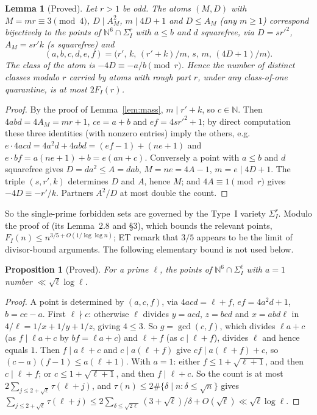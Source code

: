 \documentclass[11pt,reqno]{amsart}
\newtheorem{lemma}[theorem]{Lemma}
\newtheorem{proposition}[theorem]{Proposition}
\theoremstyle{definition}
\begin{document}
\begin{lemma}[Proved]\label{lem:dict}
Let $r>1$ be odd.  The atoms $(M,D)$ with $M=mr\equiv3\pmod4$, $D\mid A_M^2$,
$m\mid4D+1$ and $D\le A_M$ \textup{(}any $m\ge1$\textup{)} correspond
bijectively to the points of $\mathbb N^6\cap\Sigma_I^r$ with $a\le b$ and $d$
squarefree, via $D=sr'^2$, $A_M=sr'k$ \textup{(}$s$ squarefree\textup{)} and
\[
 (a,b,c,d,e,f)=\big(r',\,k,\,(r'+k)/m,\,s,\,m,\,(4D+1)/m\big).
\]
The class of the atom is $-4D\equiv-a/b\pmod r$.  Hence the number of distinct
classes modulo $r$ carried by atoms with rough part $r$, under any class-of-one
quarantine, is at most $2F_I(r)$.
\end{lemma}

\begin{proof}
By the proof of Lemma~\ref{lem:mass}, $m\mid r'+k$, so $c\in\mathbb N$.  Then
$4abd=4A_M=mr+1$, $ce=a+b$ and $ef=4sr'^2+1$; by direct computation these three
identities (with nonzero entries) imply the others, e.g.\
$e\cdot4acd=4a^2d+4abd=(ef-1)+(ne+1)$ and $e\cdot bf=a(ne+1)+b=e(an+c)$.
Conversely a point with $a\le b$ and $d$ squarefree gives $D=da^2\le A=dab$,
$M=ne=4A-1$, $m=e\mid4D+1$.  The triple $(s,r',k)$ determines $D$ and $A$,
hence $M$; and $4A\equiv1\pmod r$ gives $-4D\equiv-r'/k$.  Partners $A^2/D$ at
most double the count.
\end{proof}

So the single-prime forbidden sets are governed by the Type~I variety
$\Sigma_I^r$.  Modulo the proof of \cite[Prop.~1.7]{ET} (its Lemma~2.8 and \S3),
which bounds the relevant points, $F_I(n)\le n^{3/5+O(1/\log\log n)}$; ET remark
that $3/5$ appears to be the limit of divisor-bound arguments.  The following
elementary bound is not used below.

\begin{proposition}[Proved]\label{prop:a1}
For a prime $\ell$, the points of $\mathbb N^6\cap\Sigma_I^\ell$ with $a=1$ number
$\ll\sqrt\ell\log\ell$.
\end{proposition}

\begin{proof}
A point is determined by $(a,c,f)$, via $4acd=\ell+f$, $ef=4a^2d+1$, $b=ce-a$.
First $\ell\nmid c$: otherwise $\ell$ divides $y=acd$, $z=bcd$ and $x=abd\ell$ in
$4/\ell=1/x+1/y+1/z$, giving $4\le3$.  So $g=\gcd(c,f)$, which divides $\ell a+c$
(as $f\mid\ell a+c$ by $bf=\ell a+c$) and $\ell+f$ (as $c\mid\ell+f$), divides $\ell$
and hence equals $1$.  Then $f\mid a\ell+c$ and $c\mid a(\ell+f)$ give
$cf\mid a(\ell+f)+c$, so $(c-a)(f-1)\le a(\ell+1)$.  With $a=1$: either
$f\le1+\sqrt{\ell+1}$, and then $c\mid\ell+f$; or $c\le1+\sqrt{\ell+1}$, and then
$f\mid\ell+c$.  So the count is at most $2\sum_{j\le2+\sqrt\ell}\tau(\ell+j)$, and
$\tau(n)\le2\#\{\delta\mid n:\delta\le\sqrt n\}$ gives
$\sum_{j\le2+\sqrt\ell}\tau(\ell+j)\le2\sum_{\delta\le\sqrt{2\ell}}(3+\sqrt\ell)/\delta+O(\sqrt\ell)
\ll\sqrt\ell\log\ell$.
\end{proof}
\end{document}

